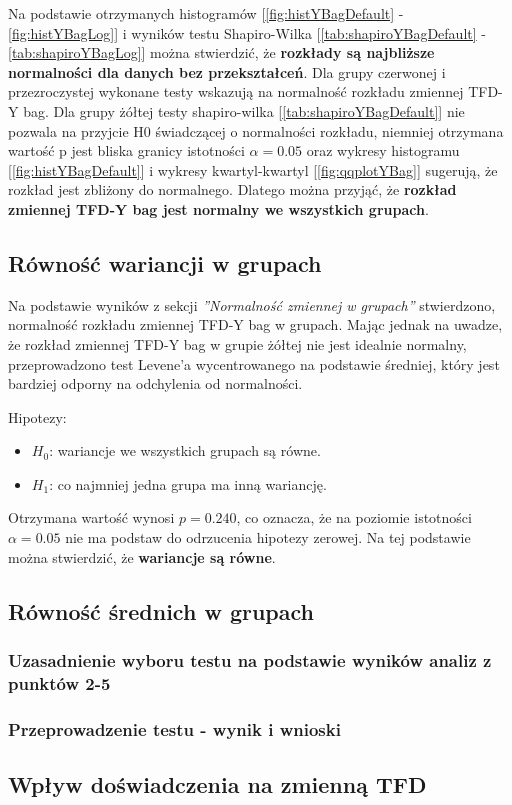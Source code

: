     Na podstawie otrzymanych histogramów [\ref{fig:histYBagDefault} - \ref{fig:histYBagLog}] i wyników testu Shapiro-Wilka 
    [\ref{tab:shapiroYBagDefault} - \ref{tab:shapiroYBagLog}] można stwierdzić, że \textbf{rozkłady są  najbliższe normalności dla danych bez przekształceń}.
    Dla grupy czerwonej i przezroczystej wykonane testy wskazują na normalność rozkładu zmiennej TFD-Y bag.
    Dla grupy żółtej testy shapiro-wilka [\ref{tab:shapiroYBagDefault}] nie pozwala na przyjcie H0 świadczącej o normalności rozkładu,
    niemniej otrzymana wartość p jest bliska granicy istotności $\alpha=0.05$ oraz wykresy histogramu [\ref{fig:histYBagDefault}] i wykresy
    kwartyl-kwartyl [\ref{fig:qqplotYBag}] sugerują, że rozkład jest zbliżony do normalnego.
    Dlatego można przyjąć, że \textbf{rozkład zmiennej TFD-Y bag jest normalny we wszystkich grupach}. 

    \subsection{Równość wariancji w grupach}
        Na podstawie wyników z sekcji \textit{''Normalność zmiennej w grupach''} stwierdzono, 
        normalność rozkładu zmiennej TFD-Y bag w grupach. Mając jednak na uwadze, że rozkład
        zmiennej TFD-Y bag w grupie żółtej nie jest idealnie normalny, przeprowadzono test Levene'a
        wycentrowanego na podstawie średniej, który jest bardziej odporny na odchylenia od normalności.

        Hipotezy:
        \begin{itemize}
            \item $H_0$: wariancje we wszystkich grupach są równe.
            \item $H_1$:  co najmniej jedna grupa ma inną wariancję.
        \end{itemize}
        Otrzymana wartość wynosi $p=0.240$, co oznacza, że na poziomie istotności $\alpha=0.05$
        nie ma podstaw do odrzucenia hipotezy zerowej. Na tej podstawie można stwierdzić, że \textbf{wariancje są równe}.

    \subsection{Równość średnich w grupach} %
        \subsubsection{Uzasadnienie wyboru testu na podstawie wyników analiz z punktów 2-5} %
        \subsubsection{Przeprowadzenie testu - wynik i wnioski} %
    \subsection{Wpływ doświadczenia na zmienną TFD} %